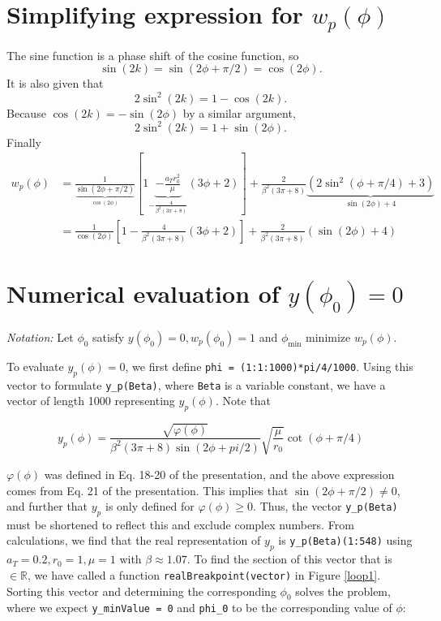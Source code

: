 \section{Simplifying expression for \texorpdfstring{$w_p(\phi)$}{}}

The sine function is a phase shift of the cosine function, so 
\begin{equation}
    \sin(2k)=\sin(2\phi+\pi/2)=\cos(2\phi).
\end{equation}
It is also given that
\begin{equation}
    2\sin^2(2k)=1-\cos(2k).
\end{equation}
Because $\cos(2k)=-\sin(2\phi)$ by a similar argument, 
\begin{equation}
    2\sin^2(2k)=1+\sin(2\phi).
\end{equation}
Finally
\begin{align}
    w_p(\phi)&=\frac{1}{\underbrace{\sin(2\phi+\pi/2)}_{\cos(2\phi)}}[1\underbrace{-\frac{a_Tr_0^2}{\mu}}_{-\frac{4}{\beta^2(3\pi+8)}}(3\phi+2)]+\frac{2}{\beta^2(3\pi+8)}\underbrace{(2\sin^2(\phi+\pi/4)+3)}_{\sin(2\phi)+4}\\
    &=\frac{1}{\cos(2\phi)}\left[1-\frac{4}{\beta^2(3\pi+8)}(3\phi+2)\right]+\frac{2}{\beta^2(3\pi+8)}(\sin(2\phi)+4)
\end{align}

\section{Numerical evaluation of \texorpdfstring{$y(\phi_0)=0$}{}}

\textit{Notation:} Let $\phi_0$ satisfy $y(\phi_0)=0,w_p(\phi_0)=1$ and $\phi_\mathrm{min}$ minimize $w_p(\phi)$.

To evaluate $y_p(\phi)=0$, we first define \verb|phi = (1:1:1000)*pi/4/1000|. 
Using this vector to formulate \verb|y_p(Beta)|, where \verb|Beta| is a variable constant, we have a vector of length 1000 representing $y_p(\phi)$.
Note that

\begin{equation}
    y_p(\phi)=\frac{\sqrt{\varphi(\phi)}}{\beta^2(3\pi+8)\sin(2\phi+pi/2)}\sqrt{\frac{\mu}{r_0}}\cot(\phi+\pi/4)
\end{equation}

$\varphi(\phi)$ was defined in Eq. 18-20 of the presentation, and the above expression comes from Eq. 21 of the presentation. This implies that $\sin(2\phi+\pi/2)\neq 0$, and further that $y_p$ is only defined for $\varphi(\phi)\geq 0$. Thus, the vector \verb|y_p(Beta)| must be shortened to reflect this and exclude complex numbers.
From calculations, we find that the real representation of $y_p$ is \verb|y_p(Beta)(1:548)| using $a_T=0.2,r_0=1,\mu=1$ with $\beta\approx 1.07$.
To find the section of this vector that is $\in \mathbb{R}$, we have called a function \verb|realBreakpoint(vector)| in Figure \ref{loop1}.
Sorting this vector and determining the corresponding $\phi_0$ solves the problem, where we expect \verb|y_minValue = 0| and \verb|phi_0| to be the corresponding value of $\phi$:

